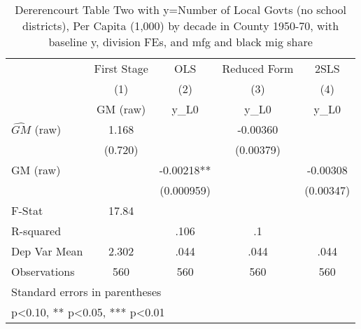 \begin{table}[htbp]\centering
\def\sym#1{\ifmmode^{#1}\else\(^{#1}\)\fi}
\caption{Dererencourt Table Two with y=Number of Local Govts (no school districts), Per Capita (1,000) by decade in County 1950-70, with baseline y, division FEs, and mfg and black mig share}
\begin{tabular}{l*{4}{c}}
\toprule
                    & First Stage   &         OLS   &Reduced Form   &        2SLS   \\
                    &\multicolumn{1}{c}{(1)}&\multicolumn{1}{c}{(2)}&\multicolumn{1}{c}{(3)}&\multicolumn{1}{c}{(4)}\\
                    &\multicolumn{1}{c}{GM  (raw)}&\multicolumn{1}{c}{y\_L0}&\multicolumn{1}{c}{y\_L0}&\multicolumn{1}{c}{y\_L0}\\
\midrule
$\hat{GM}$ (raw)    &       1.168   &               &    -0.00360   &               \\
                    &     (0.720)   &               &   (0.00379)   &               \\
\addlinespace
GM  (raw)           &               &    -0.00218** &               &    -0.00308   \\
                    &               &  (0.000959)   &               &   (0.00347)   \\
\midrule
F-Stat              &       17.84   &               &               &               \\
R-squared           &               &        .106   &          .1   &               \\
Dep Var Mean        &       2.302   &        .044   &        .044   &        .044   \\
Observations        &         560   &         560   &         560   &         560   \\
\bottomrule
\multicolumn{5}{l}{\footnotesize Standard errors in parentheses}\\
\multicolumn{5}{l}{\footnotesize * p<0.10, ** p<0.05, *** p<0.01}\\
\end{tabular}
\end{table}
